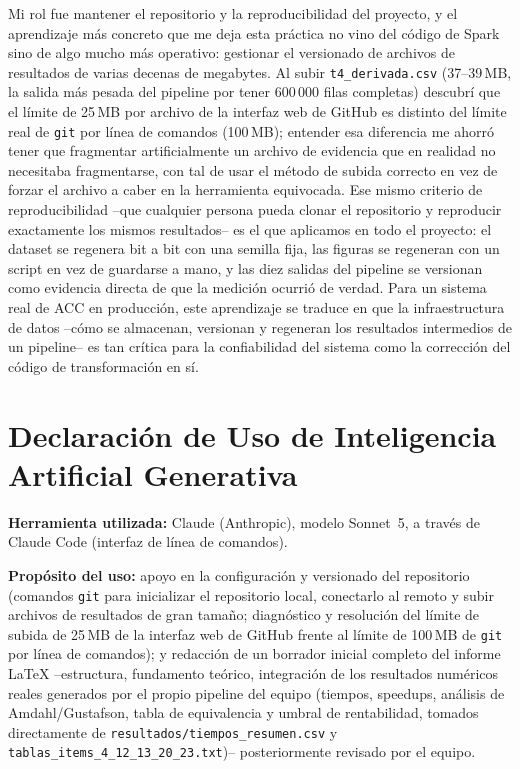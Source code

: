 \documentclass[11pt,a4paper]{article}
\begin{document}
Mi rol fue mantener el repositorio y la reproducibilidad del proyecto, y el
aprendizaje m\'as concreto que me deja esta pr\'actica no vino del c\'odigo
de Spark sino de algo mucho m\'as operativo: gestionar el versionado de
archivos de resultados de varias decenas de megabytes. Al subir
\texttt{t4\_derivada.csv} (37--39\,MB, la salida m\'as pesada del pipeline
por tener 600\,000 filas completas) descubr\'i que el l\'imite de 25\,MB por
archivo de la interfaz web de GitHub es distinto del l\'imite real de
\texttt{git} por l\'inea de comandos (100\,MB); entender esa diferencia me
ahorr\'o tener que fragmentar artificialmente un archivo de evidencia que en
realidad no necesitaba fragmentarse, con tal de usar el m\'etodo de subida
correcto en vez de forzar el archivo a caber en la herramienta equivocada.
Ese mismo criterio de reproducibilidad --que cualquier persona pueda clonar
el repositorio y reproducir exactamente los mismos resultados-- es el que
aplicamos en todo el proyecto: el dataset se regenera bit a bit con una
semilla fija, las figuras se regeneran con un script en vez de guardarse a
mano, y las diez salidas del pipeline se versionan como evidencia directa de
que la medici\'on ocurri\'o de verdad. Para un sistema real de ACC en
producci\'on, este aprendizaje se traduce en que la infraestructura de datos
--c\'omo se almacenan, versionan y regeneran los resultados intermedios de un
pipeline-- es tan cr\'itica para la confiabilidad del sistema como la
correcci\'on del c\'odigo de transformaci\'on en s\'i.

\section*{Declaraci\'on de Uso de Inteligencia Artificial Generativa}
\label{sec:declaracion-ia}

\textbf{Herramienta utilizada:} Claude (Anthropic), modelo Sonnet~5, a
trav\'es de Claude Code (interfaz de l\'inea de comandos).

\textbf{Prop\'osito del uso:} apoyo en la configuraci\'on y versionado del
repositorio (comandos \texttt{git} para inicializar el repositorio local,
conectarlo al remoto y subir archivos de resultados de gran tama\~no;
diagn\'ostico y resoluci\'on del l\'imite de subida de 25\,MB de la interfaz
web de GitHub frente al l\'imite de 100\,MB de \texttt{git} por l\'inea de
comandos); y redacci\'on de un borrador inicial completo del informe LaTeX
--estructura, fundamento te\'orico, integraci\'on de los resultados num\'ericos
reales generados por el propio pipeline del equipo (tiempos, speedups,
an\'alisis de Amdahl/Gustafson, tabla de equivalencia y umbral de
rentabilidad, tomados directamente de \texttt{resultados/tiempos\_resumen.csv}
y \texttt{tablas\_items\_4\_12\_13\_20\_23.txt})-- posteriormente revisado por
el equipo.
\end{document}
